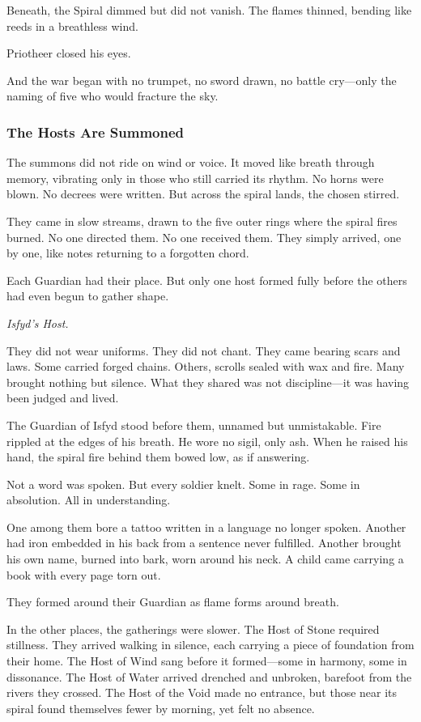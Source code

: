 \documentclass[12pt]{article}
\begin{document}
Beneath, the Spiral dimmed but did not vanish. The flames thinned, bending like reeds in a breathless wind.

Priotheer closed his eyes.

And the war began with no trumpet, no sword drawn, no battle cry—only the naming of five who would fracture the sky.


\dotfill

\subsubsection{The Hosts Are Summoned}

The summons did not ride on wind or voice. It moved like breath through memory, vibrating only in those who still carried its rhythm. No horns were blown. No decrees were written. But across the spiral lands, the chosen stirred.

They came in slow streams, drawn to the five outer rings where the spiral fires burned. No one directed them. No one received them. They simply arrived, one by one, like notes returning to a forgotten chord.

Each Guardian had their place. But only one host formed fully before the others had even begun to gather shape.

\textit{Isfyd’s Host.}

They did not wear uniforms. They did not chant. They came bearing scars and laws. Some carried forged chains. Others, scrolls sealed with wax and fire. Many brought nothing but silence. What they shared was not discipline—it was having been judged and lived.

The Guardian of Isfyd stood before them, unnamed but unmistakable. Fire rippled at the edges of his breath. He wore no sigil, only ash. When he raised his hand, the spiral fire behind them bowed low, as if answering.

Not a word was spoken. But every soldier knelt. Some in rage. Some in absolution. All in understanding.

One among them bore a tattoo written in a language no longer spoken. Another had iron embedded in his back from a sentence never fulfilled. Another brought his own name, burned into bark, worn around his neck. A child came carrying a book with every page torn out.

They formed around their Guardian as flame forms around breath.

In the other places, the gatherings were slower. The Host of Stone required stillness. They arrived walking in silence, each carrying a piece of foundation from their home. The Host of Wind sang before it formed—some in harmony, some in dissonance. The Host of Water arrived drenched and unbroken, barefoot from the rivers they crossed. The Host of the Void made no entrance, but those near its spiral found themselves fewer by morning, yet felt no absence.
\end{document}
